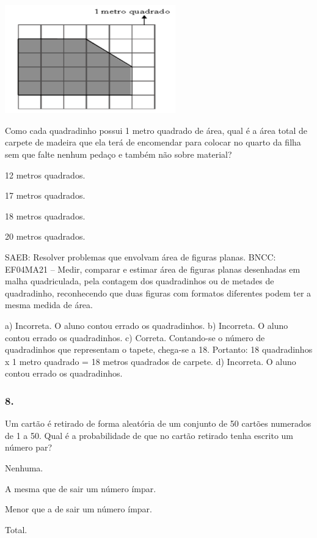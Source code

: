 \begin{mdframed}[linewidth=2pt,linecolor=salmao,roundcorner=2pt]
\begin{escolha}
{\begin{escolha}
\includegraphics[width=2.90385in,height=1.84662in]{media/image160.png}

Como cada quadradinho possui 1 metro quadrado de área, qual é a área total
de carpete de madeira que ela terá de encomendar para colocar no quarto
da filha sem que falte nenhum pedaço e também não sobre material?

\begin{escolha}
\item
  12 metros quadrados.
\item
  17 metros quadrados.
\item
  18 metros quadrados.
\item
  20 metros quadrados.
\end{escolha}

SAEB: Resolver problemas que envolvam área de figuras planas.
BNCC: EF04MA21 -- Medir, comparar e estimar área de figuras planas desenhadas em malha quadriculada,
pela contagem dos quadradinhos ou de metades de quadradinho, reconhecendo que duas figuras
com formatos diferentes podem ter a mesma medida de área.

a) Incorreta. O aluno contou errado os quadradinhos.
b) Incorreta. O aluno contou errado os quadradinhos.
c) Correta. Contando-se o número de quadradinhos que representam o tapete, chega-se a 18. Portanto: 18 quadradinhos x 1 metro quadrado = 18 metros quadrados de carpete.
d) Incorreta. O aluno contou errado os quadradinhos.

\subsubsection{8. }

Um cartão é retirado de forma aleatória de um conjunto de 50 cartões
numerados de 1 a 50. Qual é a probabilidade de que no cartão retirado
tenha escrito um número par?

\begin{escolha}
\item
  Nenhuma.
\item
  A mesma que de sair um número ímpar.
\item
  Menor que a de sair um número ímpar.
\item
  Total.
\end{escolha}


\end{escolha}}
\end{escolha}
\end{mdframed}
